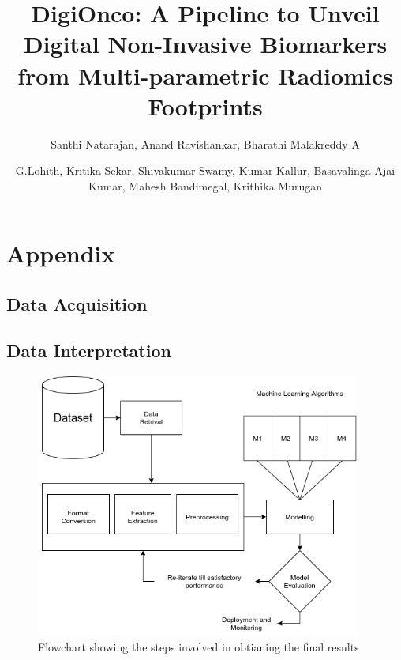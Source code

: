 \documentclass[10pt,final,1p,times,twocolumn]{elsarticle}
\begin{document}
\begin{frontmatter}
\title{DigiOnco: A Pipeline to Unveil Digital Non-Invasive Biomarkers from Multi-parametric Radiomics Footprints}


\author[label1]{Santhi Natarajan, Anand Ravishankar, Bharathi Malakreddy A}
\author[label2]{G.Lohith, Kritika Sekar, Shivakumar Swamy, Kumar Kallur, Basavalinga Ajai Kumar, Mahesh Bandimegal, Krithika Murugan}
\address[label1]{BMS Institute of Technology and Management, Visweswaraiah Technological Univesity, Bangalore, India}
\address[label2]{Health Care Global Hospitals, Bangalore, India}
\end{frontmatter}
\section{Appendix}

\subsection{Data Acquisition}

\subsection{Data Interpretation}

\begin{figure}[!b]
\centering
\includegraphics[width=10.7cm]{flowchart.png}
\caption{Flowchart showing the steps involved in obtianing the final results}
\label{img1}
\end{figure}
\end{document}
